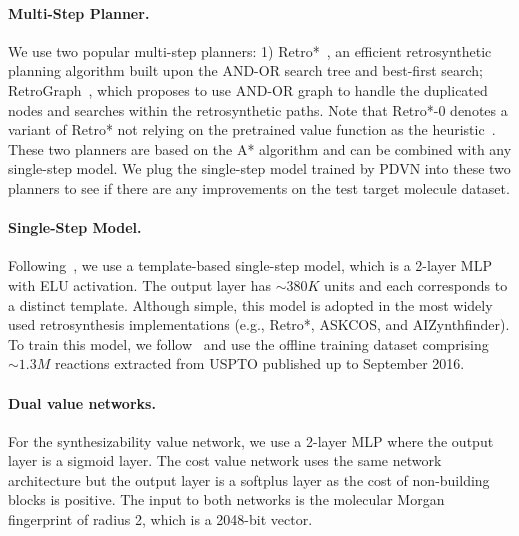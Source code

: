 \documentclass[nohyperref]{article}
\theoremstyle{plain}
\theoremstyle{definition}
\theoremstyle{remark}
\begin{document}
\paragraph{Multi-Step Planner.} We use two popular multi-step planners: 1) Retro*~\cite{chen20retrostar}, an efficient retrosynthetic planning algorithm built upon the AND-OR search tree and best-first search;
RetroGraph~\cite{xie2022retrograph}, which proposes to use AND-OR graph to handle the duplicated nodes and searches within the retrosynthetic paths.
Note that Retro*-0 denotes a variant of Retro* not relying on the pretrained value function as the heuristic~\citep{chen20retrostar}. 
These two planners are based on the A* algorithm and can be combined with any single-step model. 
We plug the single-step model trained by PDVN into these two planners to see if there are any improvements on the test target molecule dataset. 

\paragraph{Single-Step Model.}
Following~\cite{Segler2018PlanningCS, chen20retrostar, kim2021self}, we use a template-based single-step model, which is a 2-layer MLP with ELU activation. The output layer has $\sim380K$ units and each corresponds to a distinct template.
Although simple, this model is adopted in the most widely used retrosynthesis implementations (e.g., Retro*, ASKCOS, and AIZynthfinder). 
To train this model, we follow~\cite{chen20retrostar} and use the offline training dataset comprising $\sim 1.3M$ reactions extracted from USPTO published up to September 2016.


\paragraph{Dual value networks.}
For the synthesizability value network, we use a 2-layer MLP where the output layer is a sigmoid layer.
The cost value network uses the same network architecture but the output layer is a softplus layer as the cost of non-building blocks is positive.
The input to both networks is the molecular Morgan fingerprint of radius 2, which is a 2048-bit vector.
\end{document}
